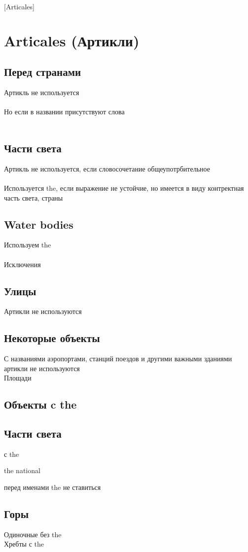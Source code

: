 [Articales]

\section{Articales (Артикли)}
\subsection{Перед странами}
\p
Артикль не используется\\
\\
Но если в названии присутствуют слова \\
\\

\subsection{Части света}
\p
Артикль не используется, если словосочетание общеупотрбительное\\
\\
Используется the, если выражение не устойчие, но имеется в виду контректная часть света, страны\\

\subsection{Water bodies}
\p
Используем the\\
\\
Исключения\\

\subsection{Улицы}
\p
Артикли не используются\\

\subsection{Некоторые объекты}
\p
С названиями аэропортами, станций поездов и другими важными зданиями
артикли не используются\\
Площади\\

\subsection{Объекты c the}

\subsection{Части света}
с the

the national

перед именами the не ставиться

\subsection{Горы}
\p
Одиночные без the\\
Хребты с the
